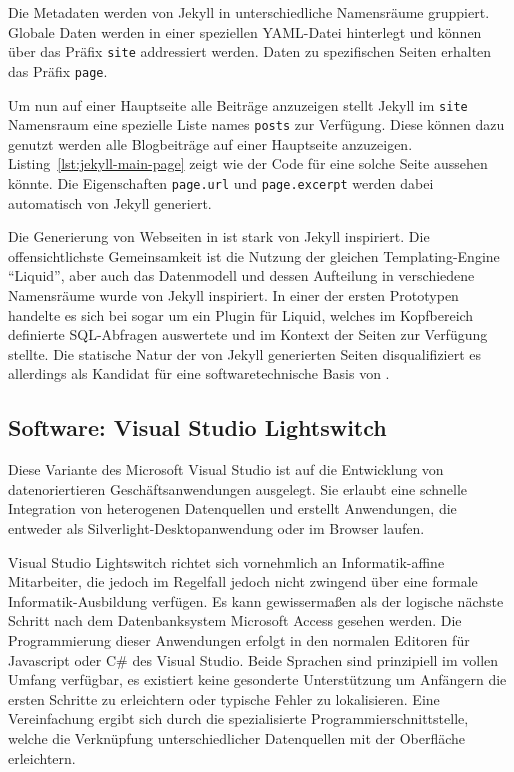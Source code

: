 Die Metadaten werden von Jekyll in unterschiedliche Namensräume gruppiert. Globale Daten werden in einer speziellen YAML-Datei hinterlegt und können über das Präfix \lstinline{site} addressiert werden. Daten zu spezifischen Seiten erhalten das Präfix \lstinline{page}.

Um nun auf einer Hauptseite alle Beiträge anzuzeigen stellt Jekyll im \lstinline{site} Namensraum eine spezielle Liste names \lstinline{posts} zur Verfügung. Diese können dazu genutzt werden alle Blogbeiträge auf einer Hauptseite anzuzeigen. Listing~\ref{lst:jekyll-main-page} zeigt wie der Code für eine solche Seite aussehen könnte. Die Eigenschaften \lstinline|page.url| und \lstinline|page.excerpt| werden dabei automatisch von Jekyll generiert.

Die Generierung von Webseiten in \idename{} ist stark von Jekyll inspiriert. Die offensichtlichste Gemeinsamkeit ist die Nutzung der gleichen Templating-Engine "`Liquid"', aber auch das Datenmodell und dessen Aufteilung in verschiedene Namensräume wurde von Jekyll inspiriert. In einer der ersten Prototypen handelte es sich bei \idename{} sogar um ein Plugin für Liquid, welches im Kopfbereich definierte SQL-Abfragen auswertete und im Kontext der Seiten zur Verfügung stellte. Die statische Natur der von Jekyll generierten Seiten disqualifiziert es allerdings als Kandidat für eine softwaretechnische Basis von \idename{}.

\subsection{Software: Visual Studio Lightswitch}

Diese Variante des Microsoft Visual Studio ist auf die Entwicklung von datenoriertieren Geschäftsanwendungen ausgelegt. Sie erlaubt eine schnelle Integration von heterogenen Datenquellen und erstellt Anwendungen, die entweder als Silverlight-Desktopanwendung oder im Browser laufen.

Visual Studio Lightswitch richtet sich vornehmlich an Informatik-affine Mitarbeiter, die jedoch im Regelfall jedoch nicht zwingend über eine formale Informatik-Ausbildung verfügen. Es kann gewissermaßen als der logische nächste Schritt nach dem Datenbanksystem Microsoft Access gesehen werden. Die Programmierung dieser Anwendungen erfolgt in den normalen Editoren für Javascript oder C\# des Visual Studio. Beide Sprachen sind prinzipiell im vollen Umfang verfügbar, es existiert keine gesonderte Unterstützung um Anfängern die ersten Schritte zu erleichtern oder typische Fehler zu lokalisieren. Eine Vereinfachung ergibt sich durch die spezialisierte Programmierschnittstelle, welche die Verknüpfung unterschiedlicher Datenquellen mit der Oberfläche erleichtern.

